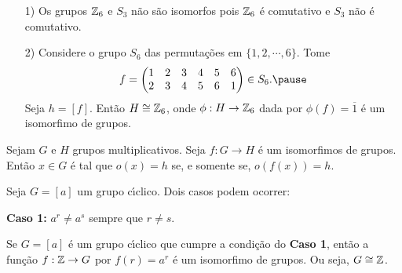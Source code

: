 \documentclass{beamer}
\begin{document}
    \begin{frame}
        \begin{exemplos}
            \vspace{.3cm}
            \begin{enumerate}
                \item[1)] Os grupos $\mathbb{Z}_6$ e $S_3$ \pause n\~ao s\~ao isomorfos \pause pois $\mathbb{Z}_6$ \'e comutativo \pause e $S_3$ n\~ao \'e comutativo.\pause

                \vspace{.3cm}

                \item[2)] Considere o grupo $S_6$ das permuta\c{c}\~oes em $\{1, 2, \cdots, 6\}$. \pause Tome
                \[
                    f = \begin{pmatrix}
                        1 & 2 & 3 & 4 & 5 & 6\\
                        2 & 3 & 4 & 5 & 6 & 1
                    \end{pmatrix} \in S_6. \pause
                \]
                Seja $h = [f]$. \pause Ent\~ao $H \cong \mathbb{Z}_6$, \pause onde $\phi : H \to \mathbb{Z}_6$ dada por $\phi(f) = \overline{1}$ \pause \'e um isomorfimo de grupos. \pause
                
                \vspace{.3cm}

            \end{enumerate}
        \end{exemplos}
    \end{frame}

    \begin{frame}
        \begin{proposicao}
            Sejam $G$ e $H$ grupos multiplicativos. \pause Seja $f : G \to H$ \'e um isomorfimos de grupos. \pause Ent\~ao $x \in G$ \pause \'e tal que $o(x) = h$ \pause se, e somente se, $o(f(x)) = h$.\pause
        \end{proposicao}
    \end{frame}

    \begin{frame}
        Seja $G = [a]$ um grupo c{\'\i}clico. \pause Dois casos podem ocorrer: \pause

        \textbf{Caso 1:} $a^r \ne a^s$ \pause sempre que $r \ne s$.\pause
    \end{frame}

    \begin{frame}
        \begin{proposicao}
            Se $G = [a]$ \'e um grupo c{\'\i}clico que cumpre a condi\c{c}\~ao do \textbf{Caso 1}, \pause ent\~ao a fun\c{c}\~ao $f : \mathbb{Z} \to G$ por $f(r) = a^r$ \pause \'e um isomorfimo de grupos. \pause Ou seja, $G \cong \mathbb{Z}$.\pause
        \end{proposicao}
    \end{frame}
\end{document}
